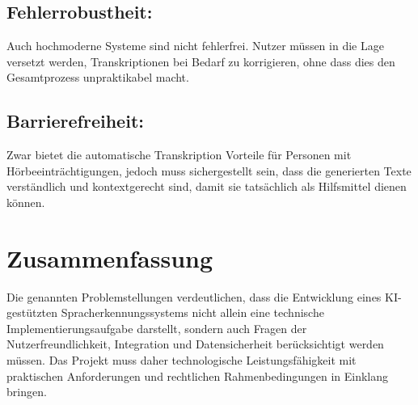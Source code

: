 \subsection{Fehlerrobustheit:}
Auch hochmoderne Systeme sind nicht fehlerfrei. Nutzer müssen in die Lage versetzt werden, Transkriptionen bei Bedarf zu korrigieren, ohne dass dies den Gesamtprozess unpraktikabel macht.

\subsection{Barrierefreiheit:}
Zwar bietet die automatische Transkription Vorteile für Personen mit Hörbeeinträchtigungen, jedoch muss sichergestellt sein, dass die generierten Texte verständlich und kontextgerecht sind, damit sie tatsächlich als Hilfsmittel dienen können.

\section{Zusammenfassung}

Die genannten Problemstellungen verdeutlichen, dass die Entwicklung eines KI-gestützten Spracherkennungssystems nicht allein eine technische Implementierungsaufgabe darstellt, sondern auch Fragen der Nutzerfreundlichkeit, Integration und Datensicherheit berücksichtigt werden müssen. Das Projekt muss daher technologische Leistungsfähigkeit mit praktischen Anforderungen und rechtlichen Rahmenbedingungen in Einklang bringen.